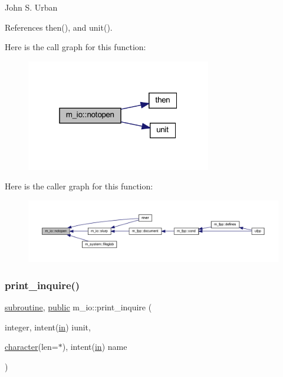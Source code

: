 John S. Urban 

References then(), and unit().

Here is the call graph for this function\+:
\nopagebreak
\begin{figure}[H]
\begin{center}
\leavevmode
\includegraphics[width=229pt]{namespacem__io_a673f7f7e137424eed9c6a736901a5cbc_cgraph}
\end{center}
\end{figure}
Here is the caller graph for this function\+:
\nopagebreak
\begin{figure}[H]
\begin{center}
\leavevmode
\includegraphics[width=350pt]{namespacem__io_a673f7f7e137424eed9c6a736901a5cbc_icgraph}
\end{center}
\end{figure}
\mbox{\label{namespacem__io_aa6ee277b2e0f1c263488624b34371fcf}} 
\subsubsection{\texorpdfstring{print\+\_\+inquire()}{print\_inquire()}}
{\footnotesize\ttfamily \hyperlink{M__stopwatch_83_8txt_acfbcff50169d691ff02d4a123ed70482}{subroutine}, \hyperlink{M__stopwatch_83_8txt_a2f74811300c361e53b430611a7d1769f}{public} m\+\_\+io\+::print\+\_\+inquire (\begin{DoxyParamCaption}\item[{integer, intent(\hyperlink{M__journal_83_8txt_afce72651d1eed785a2132bee863b2f38}{in})}]{iunit,  }\item[{\hyperlink{option__stopwatch_83_8txt_abd4b21fbbd175834027b5224bfe97e66}{character}(len=$\ast$), intent(\hyperlink{M__journal_83_8txt_afce72651d1eed785a2132bee863b2f38}{in})}]{name }\end{DoxyParamCaption})}



